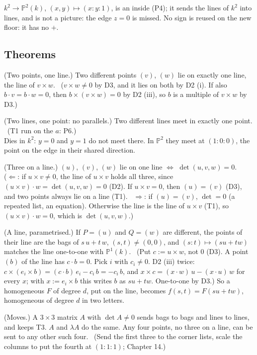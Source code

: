 \begin{lines}
\item[\lab{P7}] $k^2 \to \mathbb{P}^2(k)$, $(x, y) \mapsto (x : y : 1)$, is an inside (P4); it sends the lines of $k^2$ into lines, and is not a picture: the edge $z = 0$ is missed. No sign is reused on the new floor: it has no $+$.
\end{lines}

\subsection*{Theorems}

\begin{lines}
\item[\lab{T1}] (Two points, one line.) Two different points $(v)$, $(w)$ lie on exactly one line, the line of $v \times w$. \ ($v \times w \ne 0$ by D3, and it lies on both by D2 (i). If also $b \cdot v = b \cdot w = 0$, then $b \times (v \times w) = 0$ by D2 (iii), so $b$ is a multiple of $v \times w$ by D3.)
\item[\lab{T2}] (Two lines, one point: no parallels.) Two different lines meet in exactly one point. \ (T1 run on the $a$: P6.) \\
Dies in $k^2$: $y = 0$ and $y = 1$ do not meet there. In $\mathbb{P}^2$ they meet at $(1 : 0 : 0)$, the point on the edge in their shared direction.
\item[\lab{T3}] (Three on a line.) $(u)$, $(v)$, $(w)$ lie on one line $\iff$ $\det(u, v, w) = 0$. \\
($\Leftarrow$: if $u \times v \ne 0$, the line of $u \times v$ holds all three, since $(u \times v) \cdot w = \det(u, v, w) = 0$ (D2). If $u \times v = 0$, then $(u) = (v)$ (D3), and two points always lie on a line (T1). \ $\Rightarrow$: if $(u) = (v)$, $\det = 0$ (a repeated list, an equation). Otherwise the line is the line of $u \times v$ (T1), so $(u \times v) \cdot w = 0$, which is $\det(u, v, w)$.)
\item[\lab{T4}] (A line, parametrised.) If $P = (u)$ and $Q = (w)$ are different, the points of their line are the bags of $s\,u + t\,w$, $(s, t) \ne (0, 0)$, and $(s : t) \mapsto (s u + t w)$ matches the line one-to-one with $\mathbb{P}^1(k)$. \ (Put $c := u \times w$, not $0$ (D3). A point $(b)$ of the line has $c \cdot b = 0$. Pick $i$ with $c_i \ne 0$. D2 (iii) twice: $c \times (e_i \times b) = (c \cdot b)\, e_i - c_i\, b = -c_i\, b$, and $x \times c = (x \cdot w)\,u - (x \cdot u)\,w$ for every $x$; with $x := e_i \times b$ this writes $b$ as $s u + t w$. One-to-one by D3.) So a homogeneous $F$ of degree $d$, put on the line, becomes $f(s, t) = F(s u + t w)$, homogeneous of degree $d$ in two letters.
\item[\lab{T5}] (Moves.) A $3 \times 3$ matrix $A$ with $\det A \ne 0$ sends bags to bags and lines to lines, and keeps T3. $A$ and $\lambda A$ do the same. Any four points, no three on a line, can be sent to any other such four. \ (Send the first three to the corner lists, scale the columns to put the fourth at $(1 : 1 : 1)$; Chapter 14.)
\end{lines}

